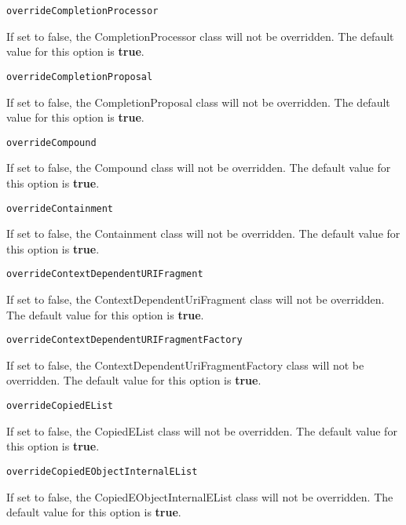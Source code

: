 \noindent\texttt{overrideCompletionProcessor}
\begin{myindentpar}{1cm}
If set to false, the CompletionProcessor class will not be overridden. The default value for this option is \textbf{true}.
\end{myindentpar}

\noindent\texttt{overrideCompletionProposal}
\begin{myindentpar}{1cm}
If set to false, the CompletionProposal class will not be overridden. The default value for this option is \textbf{true}.
\end{myindentpar}

\noindent\texttt{overrideCompound}
\begin{myindentpar}{1cm}
If set to false, the Compound class will not be overridden. The default value for this option is \textbf{true}.
\end{myindentpar}

\noindent\texttt{overrideContainment}
\begin{myindentpar}{1cm}
If set to false, the Containment class will not be overridden. The default value for this option is \textbf{true}.
\end{myindentpar}

\noindent\texttt{overrideContextDependentURIFragment}
\begin{myindentpar}{1cm}
If set to false, the ContextDependentUriFragment class will not be overridden. The default value for this option is \textbf{true}.
\end{myindentpar}

\noindent\texttt{overrideContextDependentURIFragmentFactory}
\begin{myindentpar}{1cm}
If set to false, the ContextDependentUriFragmentFactory class will not be overridden. The default value for this option is \textbf{true}.
\end{myindentpar}

\noindent\texttt{overrideCopiedEList}
\begin{myindentpar}{1cm}
If set to false, the CopiedEList class will not be overridden. The default value for this option is \textbf{true}.
\end{myindentpar}

\noindent\texttt{overrideCopiedEObjectInternalEList}
\begin{myindentpar}{1cm}
If set to false, the CopiedEObjectInternalEList class will not be overridden. The default value for this option is \textbf{true}.
\end{myindentpar}

